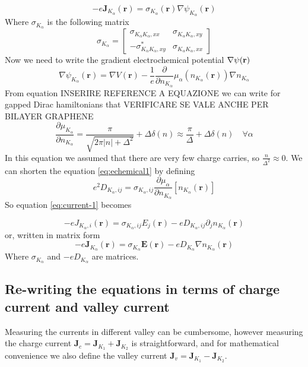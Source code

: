 \begin{equation}
    -e\mathbf J_{K_{\alpha}}(\mathbf r)= \sigma_{K_\alpha}(\mathbf r)\nabla \psi_{K_\alpha}(\mathbf r)
    \label{eq:current-1}
\end{equation}
Where $\sigma_{K_\alpha}$ is the following matrix
\[
    \sigma_{K_\alpha}=
    \begin{bmatrix}
        \sigma_{K_\alpha K_\alpha,xx} & \sigma_{K_\alpha K_\alpha,xy}\\
        -\sigma_{K_\alpha K_\alpha,xy}^* & \sigma_{K_\alpha K_\alpha,xx}
    \end{bmatrix}
\]
Now we need to write the gradient electrochemical potential $\nabla \psi(\mathbf{r})$
\begin{equation}
    \nabla \psi_{K_\alpha}(\mathbf r)=\nabla V(\mathbf r) -\frac 1e \frac{\partial}{\partial n_{K_\alpha}}\mu_\alpha(n_{K_\alpha}(\mathbf r))\nabla n_{K_\alpha}
    \label{eq:echemical1}
\end{equation}
From equation INSERIRE REFERENCE A EQUAZIONE we can write for gapped Dirac hamiltonians that VERIFICARE SE VALE ANCHE PER BILAYER GRAPHENE  \[\frac{\partial \mu_{K_\alpha}}{\partial n_{K_\alpha}}=\frac{\pi}{\sqrt{2\pi |n|+\Delta^2}}+\Delta\delta(n)\approx \frac \pi\Delta +\Delta\delta(n) \quad \forall \alpha\]
In this equation we assumed that there are very few charge carries, so $\frac n{\Delta^2}\approx 0$. We can shorten the equation \ref{eq:echemical1} by defining
\begin{equation}
    e^2D_{K_\alpha,ij}=\sigma_{K_\alpha, ij}\frac{\partial \mu_\alpha}{\partial n_{K_\alpha}}[n_{K_\alpha}(\mathbf r)]
\end{equation}
So equation \ref{eq:current-1} becomes

\begin{equation}
    -eJ_{K_\alpha,i}(\mathbf r)=\sigma_{K_\alpha, ij}E_j(\mathbf r) -eD_{K_\alpha,ij}\partial _jn_{K_\alpha}(\mathbf r)
\end{equation}
or, written in matrix form
\begin{equation}
    -e\mathbf J_{K_\alpha}(\mathbf r)=\sigma_{K_\alpha}\mathbf E(\mathbf r) -eD_{K_\alpha}\nabla n_{K_\alpha}(\mathbf r)
\end{equation}
Where $\sigma_{K_\alpha}$ and  $-eD_{K_\alpha}$ are matrices.

\subsection{Re-writing the equations in terms of charge current and valley current}
Measuring the currents in different valley can be cumbersome, however measuring the charge current $\mathbf J_{c}=\mathbf J_{K_1}+\mathbf J_{K_2}$ is straightforward, and for mathematical convenience we also define the valley current $\mathbf J_{v}=\mathbf J_{K_1}-\mathbf J_{K_2}$.

